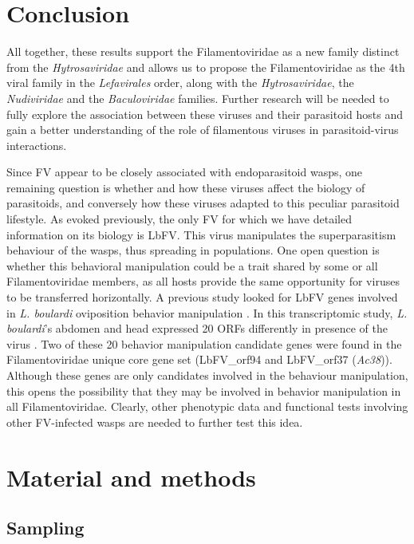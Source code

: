 \section{Conclusion} 

All together, these results support the Filamentoviridae as a new family distinct from the \textit{Hytrosaviridae} and allows us to propose the Filamentoviridae as the 4th viral family in the \textit{Lefavirales} order, along with the \textit{Hytrosaviridae}, the \textit{Nudiviridae} and the \textit{Baculoviridae} families. Further research will be needed to fully explore the association between these viruses and their parasitoid hosts and gain a better understanding of the role of filamentous viruses in parasitoid-virus interactions. 

Since FV appear to be closely associated with endoparasitoid wasps, one remaining question is whether and how these viruses affect the biology of parasitoids, and conversely how these viruses adapted to this peculiar parasitoid lifestyle. As evoked previously, the only FV for which we have detailed information on its biology is LbFV. This virus manipulates the superparasitism behaviour of the wasps, thus spreading in populations.  One open question is whether this behavioral manipulation could be a trait shared by some or all Filamentoviridae members, as all hosts provide the same opportunity for viruses to be transferred horizontally. A previous study looked for LbFV genes involved in \textit{L. boulardi} oviposition behavior manipulation \citep{varaldi_deciphering_2018}. In this transcriptomic study, \textit{L. boulardi}'s abdomen and head expressed 20 ORFs differently in presence of the virus \citep{varaldi_deciphering_2018}. Two of these 20 behavior manipulation candidate genes were found in the Filamentoviridae unique core gene set (LbFV\_orf94 and LbFV\_orf37 (\textit{Ac38})). Although these genes are only candidates involved in the behaviour manipulation, this opens the possibility that they may be involved in behavior manipulation in all Filamentoviridae. Clearly, other phenotypic data and functional tests involving other FV-infected wasps are needed to further test this idea.

\section{Material and methods}

\subsection{Sampling} 

